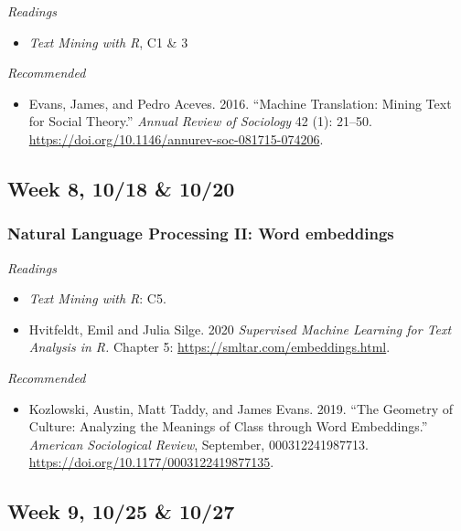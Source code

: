 \documentclass[
  10pt,
]{article}
\providecommand{\tightlist}{%
  \setlength{\itemsep}{0pt}\setlength{\parskip}{0pt}}
\begin{document}
\emph{Readings}

\begin{itemize}
\tightlist
\item
  \emph{Text Mining with R}, C1 \& 3
\end{itemize}

\emph{Recommended}

\begin{itemize}
\tightlist
\item
  Evans, James, and Pedro Aceves. 2016. ``Machine Translation: Mining
  Text for Social Theory.'' \emph{Annual Review of Sociology} 42 (1):
  21--50. \url{https://doi.org/10.1146/annurev-soc-081715-074206}.
\end{itemize}

\hypertarget{week-8-1018-1020}{%
\subsection{Week 8, 10/18 \& 10/20}\label{week-8-1018-1020}}

\hypertarget{natural-language-processing-ii-word-embeddings}{%
\subsubsection{Natural Language Processing II: Word
embeddings}\label{natural-language-processing-ii-word-embeddings}}

\emph{Readings}

\begin{itemize}
\tightlist
\item
  \emph{Text Mining with R}: C5.
\item
  Hvitfeldt, Emil and Julia Silge. 2020 \emph{Supervised Machine
  Learning for Text Analysis in R.} Chapter 5:
  \url{https://smltar.com/embeddings.html}.
\end{itemize}

\emph{Recommended}

\begin{itemize}
\tightlist
\item
  Kozlowski, Austin, Matt Taddy, and James Evans. 2019. ``The Geometry
  of Culture: Analyzing the Meanings of Class through Word Embeddings.''
  \emph{American Sociological Review}, September, 000312241987713.
  \url{https://doi.org/10.1177/0003122419877135}.
\end{itemize}

\hypertarget{week-9-1025-1027}{%
\subsection{Week 9, 10/25 \& 10/27}\label{week-9-1025-1027}}
\end{document}
